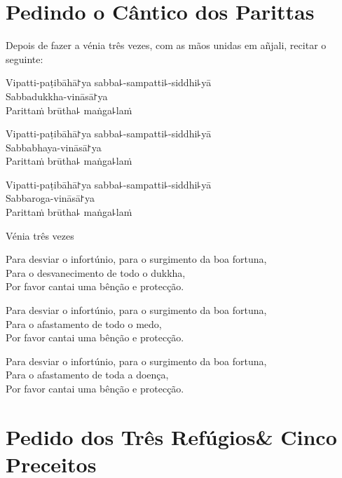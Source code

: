 \clearpage
\chapter{Pedindo o Cântico dos Parittas}

\begin{instruction}
  Depois de fazer a vénia três vezes, com as mãos unidas em añjali, recitar o seguinte:
\end{instruction}

Vipatti-paṭibāhā꜓ya sabba꜕-sampatti꜕-siddhi꜕yā\\
Sabbadukkha-vināsā꜓ya\\
Parittaṁ brūtha꜕ maṅga꜕laṁ

Vipatti-paṭibāhā꜓ya sabba꜕-sampatti꜕-siddhi꜕yā\\
Sabbabhaya-vināsā꜓ya\\
Parittaṁ brūtha꜕ maṅga꜕laṁ

Vipatti-paṭibāhā꜓ya sabba꜕-sampatti꜕-siddhi꜕yā\\
Sabbaroga-vināsā꜓ya\\
Parittaṁ brūtha꜕ maṅga꜕laṁ

\begin{instruction}
  Vénia três vezes
\end{instruction}

\begin{english}
Para desviar o infortúnio, para o surgimento da boa fortuna,\\
Para o desvanecimento de todo o dukkha,\\
Por favor cantai uma bênção e protecção.

Para desviar o infortúnio, para o surgimento da boa fortuna,\\
Para o afastamento de todo o medo,\\
Por favor cantai uma bênção e protecção.

Para desviar o infortúnio, para o surgimento da boa fortuna,\\
Para o afastamento de toda a doença,\\
Por favor cantai uma bênção e protecção.
\end{english}

\setlength{\englishIndent}{\leaderIndent}

\clearpage
\chapter[Três Refúgios \& Cinco Preceitos]{Pedido dos Três Refúgios\newline \& Cinco Preceitos}

